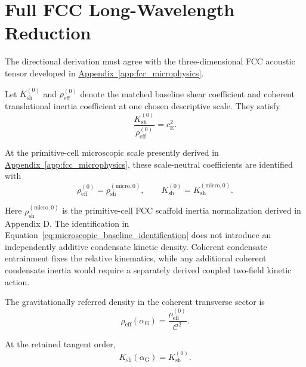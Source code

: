 \section{Full FCC Long-Wavelength Reduction}
\label{sec:grav_full_fcc_reduction}

The directional derivation must agree with the three-dimensional FCC acoustic tensor developed in \hyperref[app:fcc_microphysics]{Appendix~\ref*{app:fcc_microphysics}}.

Let $K_{\mathrm{sh}}^{(0)}$ and $\rho_{\mathrm{eff}}^{(0)}$ denote the matched baseline shear coefficient and coherent translational inertia coefficient at one chosen descriptive scale. They satisfy
\begin{equation}
    \frac{K_{\mathrm{sh}}^{(0)}}{\rho_{\mathrm{eff}}^{(0)}} = c_{\mathrm{E}}^2.
    \label{eq:baseline_scale_matched_ratio}
\end{equation}

At the primitive-cell microscopic scale presently derived in \hyperref[app:fcc_microphysics]{Appendix~\ref*{app:fcc_microphysics}}, these scale-neutral coefficients are identified with
\begin{equation}
    \rho_{\mathrm{eff}}^{(0)} = \rho_{\mathrm{sh}}^{(\mathrm{micro},0)}, \qquad K_{\mathrm{sh}}^{(0)} = K_{\mathrm{sh}}^{(\mathrm{micro},0)}.
    \label{eq:microscopic_baseline_identification}
\end{equation}

Here $\rho_{\mathrm{sh}}^{(\mathrm{micro},0)}$ is the primitive-cell FCC scaffold inertia normalization derived in Appendix D. The identification in Equation~\eqref{eq:microscopic_baseline_identification} does not introduce an independently additive condensate kinetic density. Coherent condensate entrainment fixes the relative kinematics, while any additional coherent condensate inertia would require a separately derived coupled two-field kinetic action.

The gravitationally referred density in the coherent transverse sector is
\begin{equation}
    \rho_{\mathrm{eff}} \left( \alpha_{\mathrm{G}} \right) = \frac{ \rho_{\mathrm{eff}}^{(0)} }{ \mathcal{C}^2 }.
    \label{eq:referred_density_general}
\end{equation}

At the retained tangent order,
\begin{equation}
    K_{\mathrm{sh}} \left( \alpha_{\mathrm{G}} \right) = K_{\mathrm{sh}}^{(0)}.
\end{equation}

